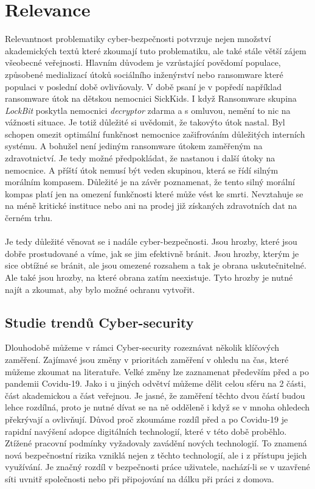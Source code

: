 


\section{Relevance}
Relevantnost problematiky cyber-bezpečnosti potvrzuje nejen množství akademických textů které zkoumají tuto problematiku, ale také stále větší zájem všeobecné veřejnosti.
Hlavním důvodem je vzrůstající povědomí populace, způsobené medializací útoků sociálního inženýrství nebo ransomware které populaci v poslední době ovlivňovaly.
V době psaní je v popředí například ransomware útok na dětskou nemocnici SickKids.\cite{bleep_sickkids_ransom}
I když Ransomware skupina \textit{LockBit} poskytla nemocnici \textit{decryptor} zdarma a s omluvou, nemění to nic na vážnosti situace.
Je totiž důležité si uvědomit, že takovýto útok nastal.
Byl schopen omezit optimální funkčnost nemocnice zašifrováním důležitých interních systému.
A bohužel není jediným ransomware útokem zaměřeným na zdravotnictví.
Je tedy možné předpokládat, že nastanou i další útoky na nemocnice.
A příští útok nemusí být veden skupinou, která se řídí silným morálním kompasem.
Důležité je na závěr poznamenat, že tento silný morální kompas platí jen na omezení funkčnosti které může vést ke smrti.
Nevztahuje se na méně kritické instituce nebo ani na prodej již získaných zdravotních dat na černém trhu.

\paragraph{}
Je tedy důležité věnovat se i nadále cyber-bezpečnosti.
Jsou hrozby, které jsou dobře prostudované a víme, jak se jim efektivně bránit.
Jsou hrozby, kterým je sice obtížné se bránit, ale jsou omezené rozsahem a tak je obrana uskutečnitelné.
Ale také jsou hrozby, na které obrana zatím neexistuje.
Tyto hrozby je nutné najít a zkoumat, aby bylo možné ochranu vytvořit.

\subsection{Studie trendů Cyber-security}
Dlouhodobě můžeme v rámci Cyber-security rozeznávat několik klíčových zaměření.
Zajímavé jsou změny v prioritách zaměření v ohledu na čas, které můžeme zkoumat na literatuře.
Velké změny lze zaznamenat především před a po pandemii Covidu-19.\cite{KUMAR2022102821}
Jako i u jiných odvětví můžeme dělit celou sféru na 2 části, část akademickou a část veřejnou.
Je jasné, že zaměření těchto dvou částí budou lehce rozdílná, proto je nutné dívat se na ně odděleně i když se v mnoha ohledech překrývají a ovlivňují.
Důvod proč zkoumáme rozdíl před a po Covidu-19 je rapidní navýšení adopce digitálních technologií, které v této době proběhlo.
Ztížené pracovní podmínky vyžadovaly zavádění nových technologií.
To znamená nová bezpečnostní rizika vzniklá nejen z těchto technologií, ale i z přístupu jejich využívání.
Je značný rozdíl v bezpečnosti práce uživatele, nachází-li se v uzavřené síti uvnitř společnosti nebo při připojování na dálku při práci z domova.

